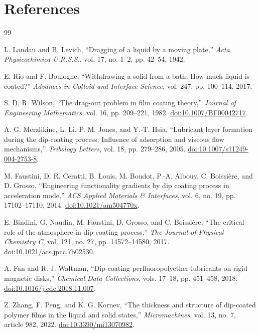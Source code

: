 \documentclass[11pt]{article}
\begin{document}
\section*{References}
\begin{thebibliography}{99}

L. Landau and B. Levich,
``Dragging of a liquid by a moving plate,''
\textit{Acta Physicochimica U.R.S.S.}, vol. 17, no. 1--2, pp. 42--54, 1942.

E. Rio and F. Boulogne,
``Withdrawing a solid from a bath: How much liquid is coated?''
\textit{Advances in Colloid and Interface Science}, vol. 247, pp. 100--114, 2017.

S. D. R. Wilson,
``The drag-out problem in film coating theory,''
\textit{Journal of Engineering Mathematics}, vol. 16, pp. 209--221, 1982.
\href{https://doi.org/10.1007/BF00042717}{doi:10.1007/BF00042717}.

A. G. Merzlikine, L. Li, P. M. Jones, and Y.-T. Hsia,
``Lubricant layer formation during the dip-coating process: Influence of adsorption and viscous flow mechanisms,''
\textit{Tribology Letters}, vol. 18, pp. 279--286, 2005.
\href{https://doi.org/10.1007/s11249-004-2753-8}{doi:10.1007/s11249-004-2753-8}.

M. Faustini, D. R. Ceratti, B. Louis, M. Boudot, P.-A. Albouy, C. Boissi\`ere, and D. Grosso,
``Engineering functionality gradients by dip coating process in acceleration mode,''
\textit{ACS Applied Materials \& Interfaces}, vol. 6, no. 19, pp. 17102--17110, 2014.
\href{https://doi.org/10.1021/am504770x}{doi:10.1021/am504770x}.

E. Bindini, G. Naudin, M. Faustini, D. Grosso, and C. Boissi\`ere,
``The critical role of the atmosphere in dip-coating process,''
\textit{The Journal of Physical Chemistry C}, vol. 121, no. 27, pp. 14572--14580, 2017.
\href{https://doi.org/10.1021/acs.jpcc.7b02530}{doi:10.1021/acs.jpcc.7b02530}.

A. Fan and R. J. Waltman,
``Dip-coating perfluoropolyether lubricants on rigid magnetic disks,''
\textit{Chemical Data Collections}, vols. 17--18, pp. 451--458, 2018.
\href{https://doi.org/10.1016/j.cdc.2018.11.007}{doi:10.1016/j.cdc.2018.11.007}.

Z. Zhang, F. Peng, and K. G. Kornev,
``The thickness and structure of dip-coated polymer films in the liquid and solid states,''
\textit{Micromachines}, vol. 13, no. 7, article 982, 2022.
\href{https://doi.org/10.3390/mi13070982}{doi:10.3390/mi13070982}.


\end{thebibliography}
\end{document}

